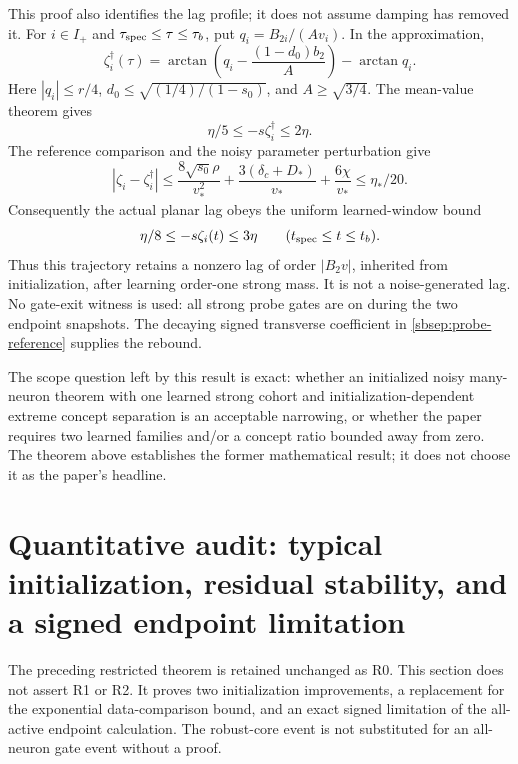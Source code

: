 \documentclass[11pt]{article}
\theoremstyle{remark}
\begin{document}
This proof also identifies the lag profile; it does not assume damping
has removed it. For $i\in I_+$ and $\tau_{\rm spec}\le\tau\le\tau_b$,
put $q_i=B_{2i}/(Av_i)$. In the approximation,
\begin{equation}\label{sbsep:lag-profile}
 \zeta_i^\dagger(\tau)=
 \arctan\left(q_i-\frac{(1-d_0)b_2}{A}\right)-\arctan q_i.
\end{equation}
Here $|q_i|\le r/4$, $d_0\le\sqrt{(1/4)/(1-s_0)}$, and
$A\ge\sqrt{3/4}$. The mean-value theorem gives
\[
 \eta/5\le-s\zeta_i^\dagger\le2\eta.
\]
The reference comparison and the noisy parameter perturbation give
\[
 |\zeta_i-\zeta_i^\dagger|
 \le\frac{8\sqrt{s_0}\rho}{v_*^2}
       +\frac{3(\delta_c+D_*)}{v_*}+\frac{6\chi}{v_*}
 \le\eta_*/20.
\]
Consequently the actual planar lag obeys the uniform learned-window bound
\begin{equation}\label{sbsep:lag-lower}
 \eta/8\le-s\zeta_i(t)\le3\eta
 \qquad(t_{\rm spec}\le t\le t_b).
\end{equation}
Thus this trajectory retains a nonzero lag of order $|B_2v|$, inherited
from initialization, after learning order-one strong mass. It is not a
noise-generated lag. No gate-exit witness is used: all strong probe gates
are on during the two endpoint snapshots. The decaying signed transverse
coefficient in \eqref{sbsep:probe-reference} supplies the rebound.

The scope question left by this result is exact: whether an initialized
noisy many-neuron theorem with one learned strong cohort and
initialization-dependent extreme concept separation is an acceptable
narrowing, or whether the paper requires two learned families and/or a
concept ratio bounded away from zero. The theorem above establishes the
former mathematical result; it does not choose it as the paper's headline.

\section{Quantitative audit: typical initialization, residual stability, and a signed endpoint limitation}
\label{sbquant:scope}

The preceding restricted theorem is retained unchanged as R0. This section
does not assert R1 or R2. It proves two initialization improvements, a
replacement for the exponential data-comparison bound, and an exact signed
limitation of the all-active endpoint calculation. The robust-core event
is not substituted for an all-neuron gate event without a proof.
\end{document}

